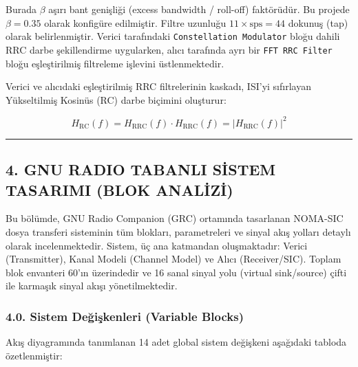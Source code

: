 \documentclass[
]{IEEEtran}
\begin{document}
Burada \(\beta\) aşırı bant genişliği (excess bandwidth / roll-off)
faktörüdür. Bu projede \(\beta = 0.35\) olarak konfigüre edilmiştir.
Filtre uzunluğu \(11 \times \text{sps} = 44\) dokunuş (tap) olarak
belirlenmiştir. Verici tarafındaki \texttt{Constellation\ Modulator}
bloğu dahili RRC darbe şekillendirme uygularken, alıcı tarafında ayrı
bir \texttt{FFT\ RRC\ Filter} bloğu eşleştirilmiş filtreleme işlevini
üstlenmektedir.

Verici ve alıcıdaki eşleştirilmiş RRC filtrelerinin kaskadı, ISI'yi
sıfırlayan Yükseltilmiş Kosinüs (RC) darbe biçimini oluşturur:

\[H_{\text{RC}}(f) = H_{\text{RRC}}(f) \cdot H_{\text{RRC}}(f) = |H_{\text{RRC}}(f)|^2\]

\begin{center}\rule{0.5\linewidth}{0.5pt}\end{center}

\subsection{4. GNU RADIO TABANLI SİSTEM TASARIMI (BLOK
ANALİZİ)}\label{gnu-radio-tabanli-sistem-tasarimi-blok-analizi}

Bu bölümde, GNU Radio Companion (GRC) ortamında tasarlanan NOMA-SIC
dosya transferi sisteminin tüm blokları, parametreleri ve sinyal akış
yolları detaylı olarak incelenmektedir. Sistem, üç ana katmandan
oluşmaktadır: Verici (Transmitter), Kanal Modeli (Channel Model) ve
Alıcı (Receiver/SIC). Toplam blok envanteri 60'ın üzerindedir ve 16
sanal sinyal yolu (virtual sink/source) çifti ile karmaşık sinyal akışı
yönetilmektedir.

\subsubsection{4.0. Sistem Değişkenleri (Variable
Blocks)}\label{sistem-deux11fiux15fkenleri-variable-blocks}

Akış diyagramında tanımlanan 14 adet global sistem değişkeni aşağıdaki
tabloda özetlenmiştir:
\end{document}
